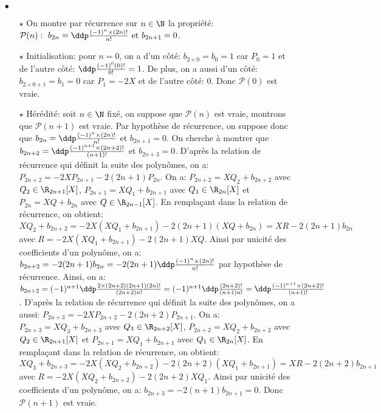\documentclass[a4paper, 11pt,reqno]{article}
\begin{document}
\begin{correction}
\begin{enumerate}
\begin{itemize}
			      \item[$\bullet$]
			            \begin{itemize}
				            \item[$\star$] On montre par r\'ecurrence sur $n\in\N$ la propri\'et\'e: $\mathcal{P}(n):\ b_{2n}=\ddp\frac{(-1)^n\times (2n)!}{n!} \ \mathrm{et}\ b_{2n+1}=0$.
				            \item[$\star$] Initialisation: pour $n=0$, on a d'un c\^{o}t\'e: $b_{2\times 0}=b_0=1$ car $P_0=1$ et de l'autre c\^{o}t\'e:
				                  $\ddp\frac{(-1)^0 (0)!}{0!}=1$. De plus, on a aussi d'un c\^{o}t\'e: $b_{2\times 0+1}=b_1=0$ car $P_1=-2X$ et de l'autre c\^{o}t\'e: 0. Donc $\mathcal{P}(0)$ est vraie.
				            \item[$\star$] H\'er\'edit\'e: soit $n\in\N$ fix\'e, on suppose que $\mathcal{P}(n)$ est vraie, montrons que $\mathcal{P}(n+1)$ est vraie. Par hypoth\`{e}se de r\'ecurrence, on suppose donc que $b_{2n}=\ddp\frac{(-1)^n\times (2n)!}{n!} $ et $b_{2n+1}=0$. On cherche \`{a} montrer que $b_{2n+2}=\ddp\frac{(-1)^{n+1}\times (2n+2)!}{(n+1)!} $ et $b_{2n+3}=0$. D'apr\`{e}s la relation de r\'ecurrence qui d\'efinit la suite des polyn\^{o}mes, on a: $P_{2n+2}=-2XP_{2n+1}-2(2n+1)P_{2n}$.  On a: $P_{2n+2}=XQ_2+b_{2n+2}$ avec $Q_2\in\R_{2n+1}\lbrack X\rbrack$, $P_{2n+1}=XQ_1+b_{2n+1}$ avec $Q_1\in\R_{2n}\lbrack X\rbrack$ et $P_{2n}=XQ+b_{2n}$ avec $Q\in\R_{2n-1}\lbrack X\rbrack$. En rempla\c{c}ant dans la relation de r\'ecurrence, on obtient: $XQ_2+b_{2n+2}=-2X(XQ_1+b_{2n+1})-2(2n+1)(XQ+b_{2n})=XR-2(2n+1)b_{2n}$ avec $R=-2X(XQ_1+b_{2n+1})-2(2n+1)XQ$. Ainsi par unicit\'e des coefficients d'un polyn\^{o}me, on a:
				                  $b_{2n+2}=-2(2n+1)b_{2n}=-2(2n+1)\ddp\frac{(-1)^n\times (2n)!}{n!} $ par hypoth\`{e}se de r\'ecurrence. Ainsi, on a: $b_{2n+2}=(-1)^{n+1}  \ddp\frac{2\times (2n+2)(2n+1)(2n)!}{(2n+2)n!}=(-1)^{n+1}\ddp\frac{(2n+2)!}{(n+1)n!}=\ddp\frac{(-1)^{n+1}\times (2n+2)!}{(n+1)!} $.
				                  D'apr\`{e}s la relation de r\'ecurrence qui d\'efinit la suite des polyn\^{o}mes, on a aussi: $P_{2n+3}=-2XP_{2n+2}-2(2n+2)P_{2n+1}$.  On a: $P_{2n+3}=XQ_3+b_{2n+3}$ avec $Q_3\in\R_{2n+2}\lbrack X\rbrack$, $P_{2n+2}=XQ_2+b_{2n+2}$ avec $Q_2\in\R_{2n+1}\lbrack X\rbrack$ et $P_{2n+1}=XQ_1+b_{2n+1}$ avec $Q_1\in\R_{2n}\lbrack X\rbrack$. En rempla\c{c}ant dans la relation de r\'ecurrence, on obtient: $XQ_3+b_{2n+3}=-2X(XQ_2+b_{2n+2})-2(2n+2)(XQ_1+b_{2n+1})=XR-2(2n+2)b_{2n+1}$ avec $R=-2X(XQ_2+b_{2n+2})-2(2n+2)XQ_1$. Ainsi par unicit\'e des coefficients d'un polyn\^{o}me, on a: $b_{2n+3}=-2(n+1)b_{2n+1}=0.$ Donc $\mathcal{P}(n+1)$ est vraie.

\end{itemize}
\end{itemize}
\end{enumerate}
\end{correction}
\end{document}
